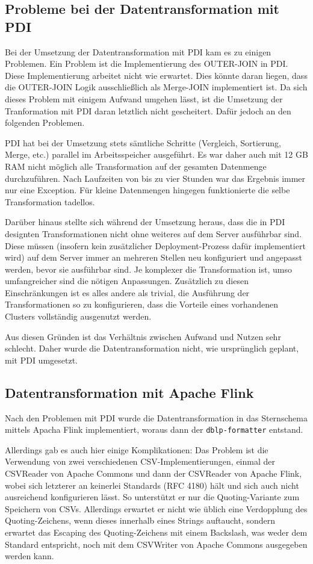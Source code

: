 \documentclass[a4paper,11pt,utf8]{scrartcl}
\begin{document}
\subsection{Probleme bei der Datentransformation mit PDI}

Bei der Umsetzung der Datentransformation mit PDI kam es zu einigen Problemen. Ein Problem ist die Implementierung des OUTER-JOIN in PDI. Diese Implementierung arbeitet nicht wie erwartet. Dies könnte daran liegen, dass die OUTER-JOIN Logik ausschließlich als Merge-JOIN implementiert ist. Da sich dieses Problem mit einigem Aufwand umgehen lässt, ist die Umsetzung der Tranformation mit PDI daran letztlich nicht gescheitert. Dafür jedoch an den folgenden Problemen.

PDI hat bei der Umsetzung stets sämtliche Schritte (Vergleich, Sortierung, Merge, etc.) parallel im Arbeitsspeicher ausgeführt. Es war daher auch mit 12 GB RAM nicht möglich alle Transformation auf der gesamten Datenmenge durchzuführen. Nach Laufzeiten von bis zu vier Stunden war das Ergebnis immer nur eine Exception. Für kleine Datenmengen hingegen funktionierte die selbe Transformation tadellos.

Darüber hinaus stellte sich während der Umsetzung heraus, dass die in PDI designten Transformationen nicht ohne weiteres auf dem Server ausführbar sind. Diese müssen (insofern kein zusätzlicher Deployment-Prozess dafür implementiert wird) auf dem Server immer an mehreren Stellen neu konfiguriert und angepasst werden, bevor sie ausführbar sind. Je komplexer die Transformation ist, umso umfangreicher sind die nötigen Anpassungen. Zusätzlich zu diesen Einschränkungen ist es alles andere als trivial, die Ausführung der Transformationen so zu konfigurieren, dass die Vorteile eines vorhandenen Clusters vollständig ausgenutzt werden.

Aus diesen Gründen ist das Verhältnis zwischen Aufwand und Nutzen sehr schlecht. Daher wurde die Datentransformation nicht, wie ursprünglich geplant, mit PDI umgesetzt.

\subsection{Datentransformation mit Apache Flink}

Nach den Problemen mit PDI wurde die Datentransformation in das Sternschema mittels Apacha Flink implementiert, woraus dann der \texttt{dblp-formatter} entstand.

Allerdings gab es auch hier einige Komplikationen: Das Problem ist die Verwendung von zwei verschiedenen CSV-Implementierungen, einmal der CSVReader von Apache Commons und dann der CSVReader von Apache Flink, wobei sich letzterer an keinerlei Standards (RFC 4180) hält und sich auch nicht ausreichend konfigurieren lässt. So unterstützt er nur die Quoting-Variante zum Speichern von CSVs. Allerdings erwartet er nicht wie üblich eine Verdopplung des Quoting-Zeichens, wenn dieses innerhalb eines Strings auftaucht, sondern erwartet das Escaping des Quoting-Zeichens mit einem Backslash, was weder dem Standard entspricht, noch mit dem CSVWriter von Apache Commons ausgegeben werden kann.
\end{document}
